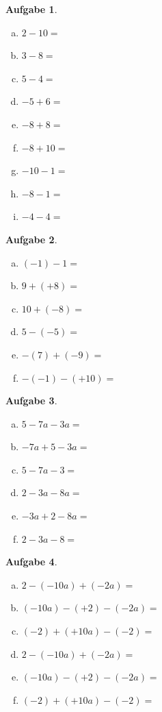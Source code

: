 \documentclass[12pt,fleqn]{article}
\theoremstyle{aufg}
\newtheorem{aufgabe}{Aufgabe}
\theoremstyle{bsp}
\begin{document}
 
    \begin{flushleft}
\begin{aufgabe} ~ \\ 
\begin{multicols}{3} 
\begin{enumerate}[a)] 
\item 
$2-10=$
\item 
$3-8=$
\item 
$5-4=$
\item 
$-5+6=$
\item 
$-8+8=$
\item 
$-8+10=$
\item 
$-10-1=$
\item 
$-8-1=$
\item 
$-4-4=$
\end{enumerate} 
\end{multicols} 
\end{aufgabe} 
\begin{aufgabe} ~ \\ 
\begin{multicols}{3} 
\begin{enumerate}[a)] 
\item 
$(-1)-1=$
\item 
$9+(+8)=$
\item 
$10+(-8)=$
\item 
$5-(-5)=$
\item 
$-(7)+(-9)=$
\item 
$-(-1)-(+10)=$
\end{enumerate} 
\end{multicols} 
\end{aufgabe} 
\begin{aufgabe} ~ \\ 
\begin{multicols}{3} 
\begin{enumerate}[a)] 
\item 
$5-7a-3a=$
\item 
$-7a+5-3a=$
\item 
$5-7a-3=$
\item 
$2-3a-8a=$
\item 
$-3a+2-8a=$
\item 
$2-3a-8=$
\end{enumerate} 
\end{multicols} 
\end{aufgabe} 
\begin{aufgabe} ~ \\ 
\begin{multicols}{3} 
\begin{enumerate}[a)] 
\item 
$2-(-10a)+(-2a)=$
\item 
$(-10a)-(+2)-(-2a)=$
\item 
$(-2)+(+10a)-(-2)=$
\item 
$2-(-10a)+(-2a)=$
\item 
$(-10a)-(+2)-(-2a)=$
\item 
$(-2)+(+10a)-(-2)=$
\end{enumerate} 
\end{multicols} 
\end{aufgabe} 
\end{flushleft} 
\end{document}
